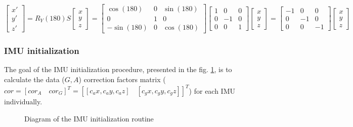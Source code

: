 \documentclass[sensors,article,submit,moreauthors,pdftex,10pt,a4paper]{mdpi}
\begin{document}
\begin{equation}
	\begin{bmatrix}
		x' \\ y' \\ z'	
	\end{bmatrix}
	= R_Y(180) S \begin{bmatrix}
	x \\ y \\ z	
	\end{bmatrix} 	= 
	\begin{bmatrix}
		\cos(180)  & 0 & \sin(180) \\ 
		0          & 1 & 0         \\ 
		-\sin(180) & 0 & \cos(180) 
	\end{bmatrix} 	
	\begin{bmatrix}
		1 & 0  & 0 \\ 
		0 & -1 & 0 \\ 
		0 & 0  & 1 
	\end{bmatrix} 	
	\begin{bmatrix}
		x \\ y \\ z	
	\end{bmatrix}	= 	
	\begin{bmatrix}
		-1 & 0  & 0  \\ 
		0  & -1 & 0  \\ 
		0  & 0  & -1 
	\end{bmatrix} 		
	\begin{bmatrix}
		x \\ y \\ z	
	\end{bmatrix}
	\label{eq:hybrid:coordinationSpaces}
\end{equation}
		
\subsubsection{IMU initialization}
The goal of the IMU initialization procedure, presented in the fig. \ref{fig:hybrid:IMUCalibration}, is to calculate the data ($G, A$) correction factors matrix ($cor = [cor_A \quad cor_G]^T = [[c_ax,c_ay,c_az ]\quad[c_gx,c_gy,c_gz ]]^T $) for each IMU individually. 
	
\begin{figure}[!htb] %
	\scalebox{0.55}{		
		
	}
	\caption{Diagram of the IMU initialization routine}
	\label{fig:hybrid:IMUCalibration}
\end{figure}
	
\end{document}
